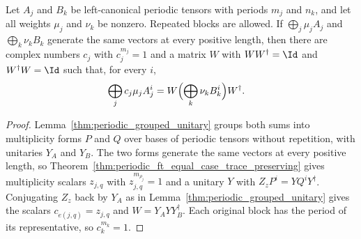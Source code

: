 \begin{lemma}%
    \label{thm:periodic_block_families_unitary_matching}
    \leanok
    Let $A_j$ and $B_k$ be left-canonical periodic tensors with periods
    $m_j$ and $n_k$, and let all weights $\mu_j$ and $\nu_k$ be nonzero.
    Repeated blocks are allowed. If
    $\bigoplus_j\mu_jA_j$ and $\bigoplus_k\nu_kB_k$ generate the same vectors
    at every positive length, then there are complex numbers $c_j$ with
    $c_j^{m_j}=1$ and a matrix $W$ with $WW^\dagger=\Id$ and
    $W^\dagger W=\Id$ such that, for every $i$,
    \begin{align}
        \bigoplus_jc_j\mu_jA_j^i & =W\Bigl(\bigoplus_k\nu_kB_k^i\Bigr)W^\dagger. \notag
    \end{align}
\end{lemma}

\begin{proof}
    \leanok
    Lemma~\ref{thm:periodic_grouped_unitary} groups both sums into
    multiplicity forms $P$ and $Q$ over bases of periodic tensors without
    repetition, with unitaries $Y_A$ and $Y_B$. The two forms generate the
    same vectors at every positive length, so
    Theorem~\ref{thm:periodic_ft_equal_case_trace_preserving} gives
    multiplicity scalars $z_{j,q}$ with $z_{j,q}^{m_{\rho_j}}=1$ and a unitary
    $Y$ with $Z_zP^i=YQ^iY^\dagger$. Conjugating $Z_z$ back by $Y_A$ as in
    Lemma~\ref{thm:periodic_grouped_unitary} gives the scalars
    $c_{e(j,q)}=z_{j,q}$ and $W=Y_AYY_B^\dagger$. Each original block has
    the period of its representative, so $c_k^{m_k}=1$.
\end{proof}

